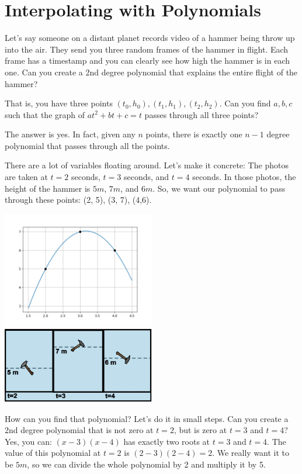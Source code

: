 \chapter{Interpolating with Polynomials}

Let's say someone on a distant planet records video of a hammer being
throw up into the air.  They send you three random frames of the
hammer in flight. Each frame has a timestamp and you can clearly see
how high the hammer is in each one. Can you create a 2nd degree
polynomial that explains the entire flight of the hammer?

That is, you have three points $(t_0, h_0), (t_1, h_1), (t_2, h_2)$.
Can you find $a,b,c$ such that the graph of $at^2 + bt + c = t$ passes
through all three points?

The answer is yes.  In fact, given any $n$ points, there is exactly
one $n-1$ degree polynomial that passes through all the points.

There are a lot of variables floating around. Let's make it concrete:
The photos are taken at $t = 2$ seconds, $t = 3$ seconds, and $t = 4$
seconds. In those photos, the height of the hammer is $5m$, $7m$, and
$6m$. So, we want our polynomial to pass through these points: (2, 5),
(3, 7), (4,6).

\includegraphics[width=0.5\textwidth]{interpolation.png} 
\includegraphics[width=0.5\textwidth]{hammer_1.png}


How can you find that polynomial? Let's do it in small steps. Can you
create a 2nd degree polynomial that is not zero at $t = 2$, but is zero
at $t = 3$ and $t = 4$? Yes, you can: $(x - 3)(x - 4)$ has
exactly two roots at $t = 3$ and $t = 4$.  The value of this polynomial at
$t = 2$ is $(2 - 3)(2 - 4) = 2$. We really want it to be $5m$, so
we can divide the whole polynomial by 2 and multiply it by 5.

